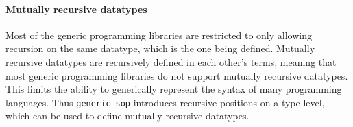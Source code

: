 \paragraph{Mutually recursive datatypes} Most of the generic programming libraries are restricted to only allowing recursion on the same datatype, which is the one being defined. Mutually recursive datatypes are recursively defined in each other's terms, meaning that most generic programming libraries do not support mutually recursive datatypes. This limits the ability to generically represent the syntax of many programming languages. Thus \texttt{generic-sop} introduces recursive positions on a type level, which can be used to define mutually recursive datatypes.